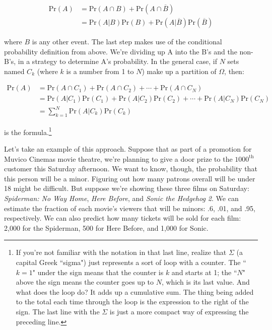 \begin{align*}
\text{Pr}(A) &= \text{Pr}(A \cap B) + \text{Pr}(A \cap \overline{B}) \\
&= \text{Pr}(A|B) \text{Pr}(B) + \text{Pr}(A|\overline{B}) \text{Pr}(\overline{B})
\end{align*}

where $B$ is any other event. The last step makes use of the conditional
probability definition from above. We're dividing up A into the B's and the
non-B's, in a strategy to determine A's probability. In the general case,
if $N$ sets named $C_k$ (where $k$ is a number from 1 to $N$) make up a
partition of $\Omega$, then:

\begin{align*}
\text{Pr}(A) &= \text{Pr}(A \cap C_1) +
\text{Pr}(A \cap C_2) + 
\cdots +
\text{Pr}(A \cap C_N) \\
&= \text{Pr}(A|C_1) \text{Pr}(C_1) +
\text{Pr}(A|C_2) \text{Pr}(C_2) +
\cdots +
\text{Pr}(A|C_N) \text{Pr}(C_N) \\
&= \sum_{k=1}^N{\text{Pr}(A|C_k) \text{Pr}(C_k)}
\end{align*}

is the formula.\footnote{If you're not familiar with the notation in that
last line, realize that $\Sigma$ (a capital Greek ``sigma") just represents
a sort of loop with a counter. The ``$k=1$" under the sign means that the
counter is $k$ and starts at 1; the ``$N$" above the sign means the counter
goes up to $N$, which is its last value. And what does the loop do? It adds
up a cumulative sum. The thing being added to the total each time through
the loop is the expression to the right of the sign. The last line with the
$\Sigma$ is just a more compact way of expressing the preceding line.}


Let's take an example of this approach. Suppose that as part of a promotion
for Muvico Cinemas movie theatre, we're planning to give a door prize to
the $1000^{\text{th}}$ customer this Saturday afternoon. We want to know,
though, the probability that this person will be a minor. Figuring out how
many patrons overall will be under 18 might be difficult. But suppose we're
showing these three films on Saturday: \textit{Spiderman: No Way Home},
\textit{Here Before}, and
\textit{Sonic the Hedgehog 2}. We can estimate the fraction of each movie's viewers
that will be minors: .6, .01, and .95, respectively. We can also predict
how many tickets will be sold for each film: 2,000 for the Spiderman, 500
for Here Before, and 1,000 for Sonic.

